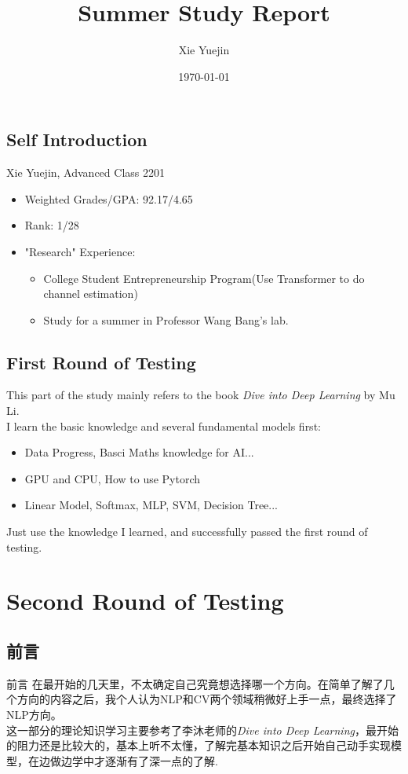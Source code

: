 \documentclass[UTF8]{ctexbeamer}
\title{Summer Study Report}
\author[Xie Yuejin(Advanced Class 2201)]{Xie Yuejin}
\institute[*]{Advanced Class 2201\\
	Huazhong University of Science and Technology\\
	u202210333@hust.edu.cn}
\date{\today}
\begin{document}
\begin{frame}
    \titlepage
\end{frame}

\begin{frame}
	\tableofcontents
\end{frame}

\begin{frame}
\section{Self Introduction}
Xie Yuejin, Advanced Class 2201
\begin{itemize}
	\item Weighted Grades/GPA: 92.17/4.65
	\item Rank: 1/28
	\item "Research" Experience: 
	\begin{itemize}
		\item College Student Entrepreneurship Program(Use Transformer to do channel estimation)
		\item Study for a summer in Professor Wang Bang's lab.
	\end{itemize}
\end{itemize}
\end{frame}

\begin{frame}
\section{First Round of Testing}
This part of the study mainly refers to the book \emph{Dive into Deep Learning} by Mu Li.\\
I learn the basic knowledge and several fundamental models first:
\begin{itemize}
	\item Data Progress, Basci Maths knowledge for AI...
	\item GPU and CPU, How to use Pytorch
	\item Linear Model, Softmax, MLP, SVM, Decision Tree...
\end{itemize}
Just use the knowledge I learned, and successfully passed the first round of testing.
\end{frame}
\section{Second Round of Testing}
\subsection{前言}
\begin{frame}{前言}	
在最开始的几天里，不太确定自己究竟想选择哪一个方向。在简单了解了几个方向的内容之后，我个人认为NLP和CV两个领域稍微好上手一点，最终选择了NLP方向。\\
这一部分的理论知识学习主要参考了李沐老师的\emph{Dive into Deep Learning}，最开始的阻力还是比较大的，基本上听不太懂，了解完基本知识之后开始自己动手实现模型，在边做边学中才逐渐有了深一点的了解.\\
\end{frame}
\end{document}
